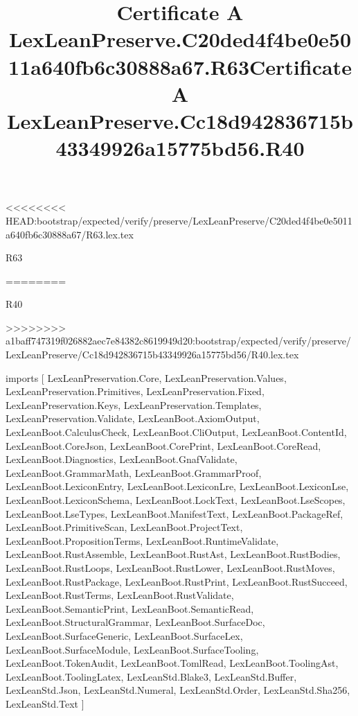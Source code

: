 <<<<<<<< HEAD:bootstrap/expected/verify/preserve/LexLeanPreserve/C20ded4f4be0e5011a640fb6c30888a67/R63.lex.tex
\begin{lexlean}{R63}
\title{Certificate A LexLeanPreserve.C20ded4f4be0e5011a640fb6c30888a67.R63}
========
\begin{lexlean}{R40}
\title{Certificate A LexLeanPreserve.Cc18d942836715b43349926a15775bd56.R40}
>>>>>>>> a1baff747319f026882aec7e84382c8619949d20:bootstrap/expected/verify/preserve/LexLeanPreserve/Cc18d942836715b43349926a15775bd56/R40.lex.tex
\begin{coremodule}
imports [
  LexLeanPreservation.Core,
  LexLeanPreservation.Values,
  LexLeanPreservation.Primitives,
  LexLeanPreservation.Fixed,
  LexLeanPreservation.Keys,
  LexLeanPreservation.Templates,
  LexLeanPreservation.Validate,
  LexLeanBoot.AxiomOutput,
  LexLeanBoot.CalculusCheck,
  LexLeanBoot.CliOutput,
  LexLeanBoot.ContentId,
  LexLeanBoot.CoreJson,
  LexLeanBoot.CorePrint,
  LexLeanBoot.CoreRead,
  LexLeanBoot.Diagnostics,
  LexLeanBoot.GnafValidate,
  LexLeanBoot.GrammarMath,
  LexLeanBoot.GrammarProof,
  LexLeanBoot.LexiconEntry,
  LexLeanBoot.LexiconLre,
  LexLeanBoot.LexiconLse,
  LexLeanBoot.LexiconSchema,
  LexLeanBoot.LockText,
  LexLeanBoot.LseScopes,
  LexLeanBoot.LseTypes,
  LexLeanBoot.ManifestText,
  LexLeanBoot.PackageRef,
  LexLeanBoot.PrimitiveScan,
  LexLeanBoot.ProjectText,
  LexLeanBoot.PropositionTerms,
  LexLeanBoot.RuntimeValidate,
  LexLeanBoot.RustAssemble,
  LexLeanBoot.RustAst,
  LexLeanBoot.RustBodies,
  LexLeanBoot.RustLoops,
  LexLeanBoot.RustLower,
  LexLeanBoot.RustMoves,
  LexLeanBoot.RustPackage,
  LexLeanBoot.RustPrint,
  LexLeanBoot.RustSucceed,
  LexLeanBoot.RustTerms,
  LexLeanBoot.RustValidate,
  LexLeanBoot.SemanticPrint,
  LexLeanBoot.SemanticRead,
  LexLeanBoot.StructuralGrammar,
  LexLeanBoot.SurfaceDoc,
  LexLeanBoot.SurfaceGeneric,
  LexLeanBoot.SurfaceLex,
  LexLeanBoot.SurfaceModule,
  LexLeanBoot.SurfaceTooling,
  LexLeanBoot.TokenAudit,
  LexLeanBoot.TomlRead,
  LexLeanBoot.ToolingAst,
  LexLeanBoot.ToolingLatex,
  LexLeanStd.Blake3,
  LexLeanStd.Buffer,
  LexLeanStd.Json,
  LexLeanStd.Numeral,
  LexLeanStd.Order,
  LexLeanStd.Sha256,
  LexLeanStd.Text
]


\end{coremodule}
\end{lexlean}
\end{lexlean}

